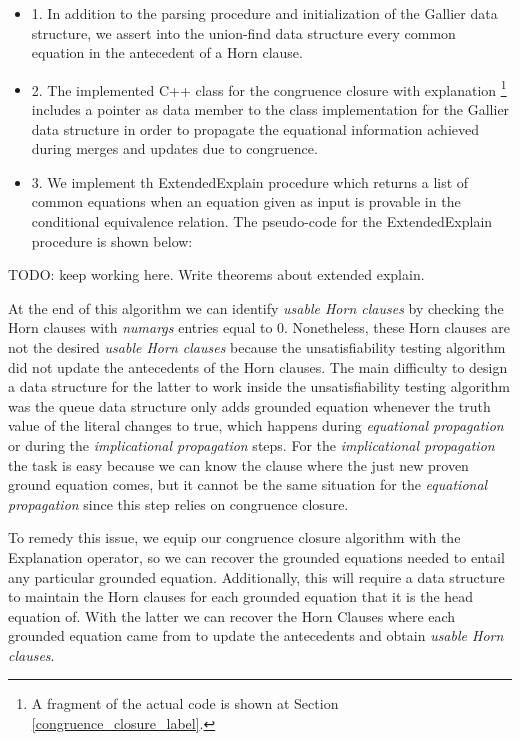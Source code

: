 \begin{itemize}
  \item[] 1. In addition to the parsing procedure
    and initialization of the Gallier data structure,
    we assert into the union-find data structure 
    every common equation in the 
    antecedent of a Horn clause.
  \item[] 2. The implemented C++ class for 
    the congruence closure with explanation 
    \footnote{
      A fragment of the actual code is shown
      at Section \ref{congruence_closure_label}.
    } 
    includes a pointer as data member to the 
    class implementation
    for the Gallier data structure in order to propagate 
    the equational information achieved during
    merges and updates due to congruence.
  \item[] 3. We implement th ExtendedExplain 
    procedure which returns a list of common equations
    when an equation given as input is provable in the 
    conditional equivalence relation. The pseudo-code
    for the ExtendedExplain procedure is shown 
    below:
\end{itemize}



TODO: keep working here. Write theorems about extended explain.

At the end of this algorithm we can identify 
\emph{usable Horn clauses} by checking the Horn clauses
with \emph{numargs} entries equal to 0. Nonetheless, these 
Horn clauses are not the
desired \emph{usable Horn clauses} because the 
unsatisfiability testing algorithm
did not update the antecedents of the Horn clauses. 
The main difficulty to design a data structure
for the latter to work inside the unsatisfiability 
testing algorithm was the queue data structure
only adds grounded equation whenever the truth 
value of the literal changes to true, which happens
during \emph{equational propagation} or during 
the \emph{implicational propagation} steps.
For the \emph{implicational propagation} the task is 
easy because we can know the clause
where the just new proven ground equation comes, 
but it cannot be the same situation
for the \emph{equational propagation} since this 
step relies on congruence closure.

To remedy this issue, we equip our congruence closure 
algorithm with the Explanation operator, so
we can recover the grounded equations needed to entail 
any particular grounded equation. Additionally,
this will require a data structure to maintain the Horn 
clauses for each grounded equation that
it is the head equation of. With the latter we can 
recover the Horn Clauses where each grounded
equation came from to update the antecedents and 
obtain \emph{usable Horn clauses}.

